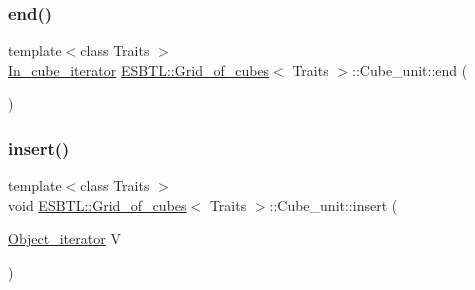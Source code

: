 \subsubsection{\texorpdfstring{end()}{end()}}
{\footnotesize\ttfamily template$<$class Traits $>$ \\
\hyperlink{structESBTL_1_1Grid__of__cubes_1_1Cube__unit_a9a5e21b8376bdeb122987e83f89b3c06}{In\+\_\+cube\+\_\+iterator} \hyperlink{structESBTL_1_1Grid__of__cubes}{E\+S\+B\+T\+L\+::\+Grid\+\_\+of\+\_\+cubes}$<$ Traits $>$\+::Cube\+\_\+unit\+::end (\begin{DoxyParamCaption}{ }\end{DoxyParamCaption})\hspace{0.3cm}{\ttfamily [inline]}}

\mbox{\label{structESBTL_1_1Grid__of__cubes_1_1Cube__unit_a96edfca91ff075b8f813d73049c2bb6f}} 
\subsubsection{\texorpdfstring{insert()}{insert()}}
{\footnotesize\ttfamily template$<$class Traits $>$ \\
void \hyperlink{structESBTL_1_1Grid__of__cubes}{E\+S\+B\+T\+L\+::\+Grid\+\_\+of\+\_\+cubes}$<$ Traits $>$\+::Cube\+\_\+unit\+::insert (\begin{DoxyParamCaption}\item[{\hyperlink{structESBTL_1_1Grid__of__cubes_ae77665f05d6c7ae05c3d2d764df99193}{Object\+\_\+iterator}}]{V }\end{DoxyParamCaption})\hspace{0.3cm}{\ttfamily [inline]}}

\mbox{\label{structESBTL_1_1Grid__of__cubes_1_1Cube__unit_a207c17f6be076ef8d2b5c97b743c6eec}} 
